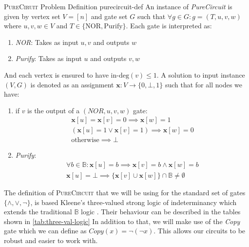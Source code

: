 \begin{definitionbox}{\textsc{PureCiruit} Problem Definition \cite{deligkas_PureCircuitTightInapproximability_2024}}{purecircuit-def}
An instance of \textit{PureCircuit} is given by vertex set $V= [n]$ and gate set $G$ such that
$\forall g \in G: g=(T,u,v,w)$ where $u,v,w \in V$ and $T \in \{\text{NOR}, \text{Purify}\}$.
Each gate is interpreted as:
\begin{enumerate}
    \item \textit{NOR}: Takes as input $u,v$ and outputs $w$
    \item \textit{Purify}: Takes as input $u$ and outputs $v,w$
\end{enumerate}
And each vertex is ensured to have $\text{in-deg}(v) \leq 1$.
A solution to input instance $(V,G)$ is denoted as an assignment $\mathbf{x} : V \to \{0, \bot, 1\}$
such that for all nodes we have:
\begin{enumerate}
    \item if $v$ is the output of a $(\textit{NOR}, u,v,w)$ gate:
       \begin{gather*}
            \mathbf{x}[u] = \mathbf{x}[v] = 0 \implies \mathbf{x}[w] = 1\\
            (\mathbf{x}[u] =1 \vee \mathbf{x}[v] =1) \implies \mathbf{x}[w] = 0 \\
            \text{otherwise} \implies \bot
        \end{gather*}

    \item \textit{Purify}: 
       \begin{gather*}
           \forall b \in \mathbb{B}: \mathbf{x}[u] = b \implies \mathbf{x}[v] = b \wedge \mathbf{x}[w] =  b\\
           \mathbf{x}[u] = \bot \implies \{\mathbf{x}[v] \cup \mathbf{x}[w] \} \cap \mathbb{B}\neq \emptyset
        \end{gather*}
\end{enumerate}
\end{definitionbox}

The definition of \textsc{PureCircuit} that we will be using for the standard set of gates
$\{\wedge, \vee, \neg\}$, is based Kleene's three-valued strong logic of indeterminancy
which extends the traditional $\mathbb{B}$ logic \cite{kleene_IntroductionMetamathematics_2009}.
Their behaviour can be described in the tables shown in \ref{tab:three-val-logic}
In addition to that, we will make use of the \textit{Copy} gate which we can define as $\textit{Copy}(x) = \neg (\neg x)$.
This allows our circuits to be robust and easier to work with.

